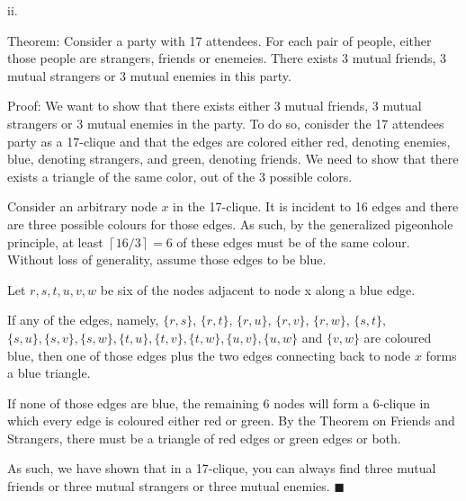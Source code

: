 \documentclass{article}
\renewcommand{\(}{\left(}
\renewcommand{\)}{\right)}
\newcommand{\ceil}[1]{\left\lceil#1\right\rceil}
\renewcommand\qedsymbol{$\blacksquare$}
\theoremstyle{plain}
\theoremstyle{plain}
\theoremstyle{definition}
\begin{document}
    ii.
    \begin{shaded}
        Theorem: Consider a party with 17 attendees. For each pair of people, either those people are strangers, friends or enemeies. There exists 3 mutual friends, 3 mutual strangers or 3 mutual enemies in this party.

        \vspace{4mm}

        Proof: We want to show that there exists either 3 mutual friends, 3 mutual strangers or 3 mutual enemies in the party. To do so, conisder the 17 attendees party as a 17-clique and that the edges are colored either red, denoting enemies, blue, denoting strangers, and green, denoting friends. We need to show that there exists a triangle of the same color, out of the 3 possible colors.

        \vspace{4mm}

        Consider an arbitrary node $x$ in the 17-clique. It is incident to 16 edges and there are three possible colours for those edges. As such, by the generalized pigeonhole principle, at least $\ceil{16/3}=6$ of these edges must be of the same colour. Without loss of generality, assume those edges to be blue.

        \vspace{4mm}
        Let $r,s,t,u,v,w$ be six of the nodes adjacent to node x along a blue edge.

        \vspace{4mm}
        If any of the edges, namely, $\{r,s\}$, $\{r,t\}$, $\{r,u\}$, $\{r,v\}$, $\{r,w\}$, $\{s,t\}$, $\{s,u\},\{s,v\},\{s,w\},\{t,u\},\{t,v\},\{t,w\},\{u,v\},\{u,w\}$ and $\{v,w\}$ are coloured blue, then one of those edges plus the two edges connecting back to node $x$ forms a blue triangle.

        \vspace{4mm}
        If none of those edges are blue, the remaining 6 nodes will form a 6-clique in which every edge is coloured either red or green. By the Theorem on Friends and Strangers, there must be a triangle of red edges or green edges or both.

        \vspace{4mm}
        As such, we have shown that in a 17-clique, you can always find three mutual friends or three mutual strangers or three mutual enemies. \qedsymbol



\end{shaded}
\end{document}

